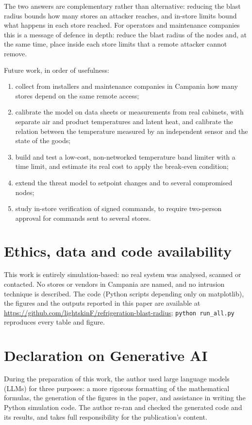 \documentclass{ceurart}
\begin{document}
The two answers are complementary rather than alternative: reducing the blast radius bounds how many stores an attacker reaches, and in-store limits bound what happens in each store reached.
For operators and maintenance companies this is a message of defence in depth: reduce the blast radius of the nodes and, at the same time, place inside each store limits that a remote attacker cannot remove.

Future work, in order of usefulness:
\begin{enumerate}
  \item collect from installers and maintenance companies in Campania how many stores depend on the same remote access;
  \item calibrate the model on data sheets or measurements from real cabinets, with separate air and product temperatures and latent heat, and calibrate the relation between the temperature measured by an independent sensor and the state of the goods;
  \item build and test a low-cost, non-networked temperature band limiter with a time limit, and estimate its real cost to apply the break-even condition;
  \item extend the threat model to setpoint changes and to several compromised nodes;
  \item study in-store verification of signed commands, to require two-person approval for commands sent to several stores.
\end{enumerate}

\section*{Ethics, data and code availability}

This work is entirely simulation-based: no real system was analysed, scanned or contacted.
No stores or vendors in Campania are named, and no intrusion technique is described.
The code (Python scripts depending only on matplotlib), the figures and the outputs reported in this paper are available at \url{https://github.com/lightskinF/refrigeration-blast-radius}; \texttt{python run\_all.py} reproduces every table and figure.

\section*{Declaration on Generative AI}

During the preparation of this work, the author used large language models (LLMs) for three purposes: a more rigorous formatting of the mathematical formulas, the generation of the figures in the paper, and assistance in writing the Python simulation code.
The author re-ran and checked the generated code and its results, and takes full responsibility for the publication's content.


\end{document}
